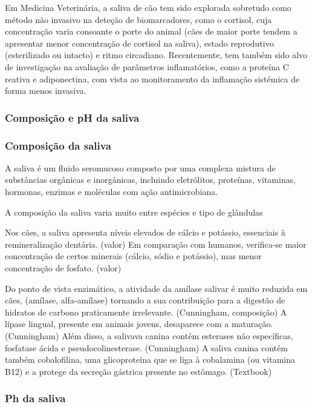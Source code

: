 Em Medicina Veterinária, a saliva de cão tem sido explorada sobretudo como método não invasivo na deteção de biomarcadores, como o cortisol, cuja concentração varia consoante o porte do animal (cães de maior porte tendem a apresentar menor concentração de cortisol na saliva), estado reprodutivo (esterilizado ou intacto) e ritmo circadiano.\cite{damian_serial_2018,Pasha2018} Recentemente, tem também sido alvo de investigação na avaliação de parâmetros inflamatórios, como a proteína C reativa e adiponectina, com vista ao monitoramento da inflamação sistémica de forma menos invasiva.\cite{Pasha2018} 

\subsubsection{Composição e pH da saliva}

\subsubsection{Composição da saliva}

A saliva é um fluido seromucoso composto por uma complexa mistura de substâncias orgânicas e inorgânicas, incluindo eletrólitos, proteínas, vitaminas, hormonas, enzimas e moléculas com ação antimicrobiana. \cite{lobprise_oral_2019}

A composição da saliva varia muito entre espécies e tipo de glândulas \cite{Das_Textbook}

Nos cães, a saliva apresenta níveis elevados de cálcio e potássio, essenciais à remineralização dentária. (valor) Em comparação com humanos, verifica-se maior concentração de certos minerais (cálcio, sódio e potássio), mas menor concentração de fosfato. (valor)

Do ponto de vista enzimático, a atividade da amílase salivar é muito reduzida em cães, (amílase, alfa-amílase) tornando a sua contribuição para a digestão de hidratos de carbono praticamente irrelevante. (Cunningham, composição) A lípase lingual, presente em animais jovens, desaparece com a maturação. (Cunningham) Além disso, a salivava canina contém esterases não específicas, fosfatase ácida e pseudocolinesterase. (Cunningham) A saliva canina contém também cobalofilina, uma glicoproteína que se liga à cobalamina (ou vitamina B12) e a protege da secreção gástrica presente no estômago. (Textbook) 

\subsubsection{Ph da saliva}


